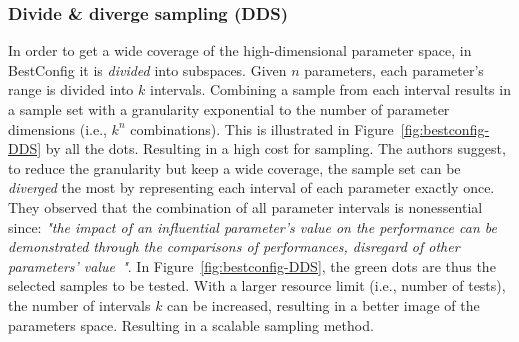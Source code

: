 \subsubsection{Divide \& diverge sampling (DDS)}
In order to get a wide coverage of the high-dimensional parameter space, in BestConfig it is \textit{divided} into subspaces. Given $n$ parameters, each parameter's range is divided into $k$ intervals. Combining a sample from each interval results in a sample set with a  granularity exponential to the number of parameter dimensions (i.e., $k^n$ combinations). This is illustrated in Figure~\ref{fig:bestconfig-DDS} by all the dots. Resulting in a high cost for sampling. The authors suggest, to reduce the granularity but keep a wide coverage,  the sample set can be \textit{diverged} the most by representing each interval of each parameter exactly once. They observed that the combination of all parameter intervals is nonessential since: \textit{"the impact of an influential parameter's value on the performance can be demonstrated through the comparisons of performances, disregard of other parameters' value~\cite{zhu2017bestconfig}"}. In  Figure~\ref{fig:bestconfig-DDS}, the green dots are thus the selected samples to be tested. With a larger resource limit (i.e., number of tests), the number of intervals $k$ can be increased, resulting in a better image of the parameters space. Resulting in a scalable sampling method.~\cite{zhu2017bestconfig}
